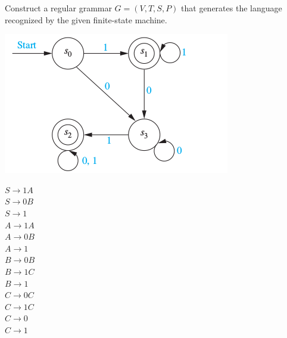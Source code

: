 \documentclass[../main.tex]{subfiles}
\begin{document}
Construct a regular grammar $G = (V, T, S, P)$ that generates the language recognized by the given finite-state machine.

\includegraphics[width=\textwidth]{img/Q13_4_17}
\solution

$S \rightarrow 1A$\\ 
$S \rightarrow 0B$\\
$S \rightarrow 1$\\
$A \rightarrow 1A$\\
$A \rightarrow 0B$\\
$A \rightarrow 1$\\
$B \rightarrow 0B$\\
$B \rightarrow 1C$\\
$B \rightarrow 1$\\
$C \rightarrow 0C$\\
$C \rightarrow 1C$\\
$C \rightarrow 0$\\
$C \rightarrow 1$
\end{document}
